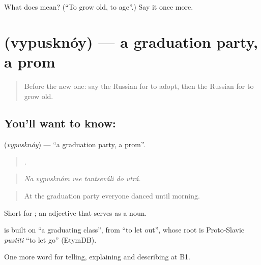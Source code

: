 \begin{tcolorbox}[breakable,colback=teal!4,colframe=teal!35!black,title={Before you move on}]
What does  mean? (\textquotedblleft{}To grow old, to age\textquotedblright{}.) Say it once more.
\end{tcolorbox}
\section[\texorpdfstring{\ru{выпускной} (vypusknóy)}{выпускной (vypusknóy)}]{ (vypusknóy) — a graduation party, a prom}

\label{lesson:RU-C305-vypusknoy}



\begin{quote}
Before the new one: say the Russian for to adopt, then the Russian for to grow old.
\end{quote}

\subsection*{You'll want to know: }
\textbf{} (\emph{vypusknóy}) — \textquotedblleft{}a graduation party, a prom\textquotedblright{}.

\begin{quote}
     .
\end{quote}

\begin{quote}
\emph{Na vypusknóm vse tantseváli do utrá.}
\end{quote}

\begin{quote}
At the graduation party everyone danced until morning.
\end{quote}

Short for \emph{ }; an adjective that serves as a noun.

\begin{cousinweb}
\emph{} is built on \emph{} \textquotedblleft{}a graduating class\textquotedblright{}, from \emph{} \textquotedblleft{}to let out\textquotedblright{}, whose root is Proto-Slavic \emph{pustiti} \textquotedblleft{}to let go\textquotedblright{} (EtymDB).
\end{cousinweb}

\begin{grammarlens}[title={What you've built}]
One more word for telling, explaining and describing at B1.
\end{grammarlens}


